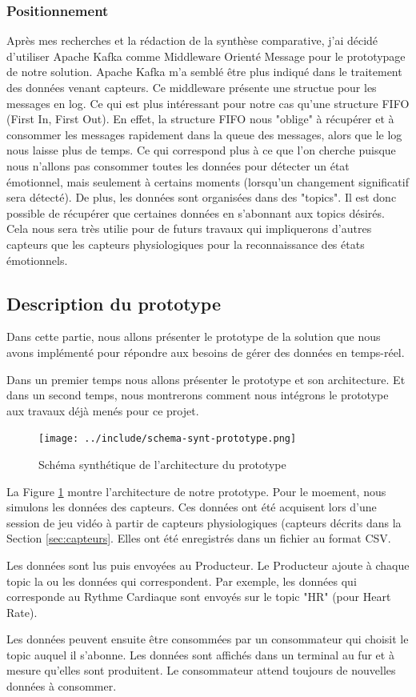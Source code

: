 \documentclass{article}
\begin{document}
		\subsubsection{Positionnement}
			Après mes recherches et la rédaction de la synthèse comparative, j'ai décidé d'utiliser Apache Kafka comme Middleware Orienté Message pour le prototypage de notre solution.
			Apache Kafka m'a semblé être plus indiqué dans le traitement des données venant capteurs.
			Ce middleware présente une structue pour les messages en log.
			Ce qui est plus intéressant pour notre cas qu'une structure FIFO (First In, First Out).
			En effet, la structure FIFO nous "oblige" à récupérer et à consommer les messages rapidement dans la queue des messages, alors que le log nous laisse plus de temps.
			Ce qui correspond plus à ce que l'on cherche puisque nous n'allons pas consommer toutes les données pour détecter un état émotionnel, mais seulement à certains moments (lorsqu'un changement significatif sera détecté).
			De plus, les données sont organisées dans des "topics".
			Il est donc possible de récupérer que certaines données en s'abonnant aux topics désirés.
			Cela nous sera très utilie pour de futurs travaux qui impliquerons d'autres capteurs que les capteurs physiologiques pour la reconnaissance des états émotionnels.
	\subsection{Description du prototype}
		Dans cette partie, nous allons présenter le prototype de la solution que nous avons implémenté pour répondre aux besoins de gérer des données en temps-réel.\par
		Dans un premier temps nous allons présenter le prototype et son architecture.
		Et dans un second temps, nous montrerons comment nous intégrons le prototype aux travaux déjà menés pour ce projet.\par
		\begin{figure}
			\centering
			\texttt{[image: ../include/schema-synt-prototype.png]}
			\caption{Schéma synthétique de l'architecture du prototype}
			\label{fig:archiproto}
		\end{figure}
		La Figure \ref{fig:archiproto} montre l'architecture de notre prototype.
		Pour le moement, nous simulons les données des capteurs.
		Ces données ont été acquisent lors d'une session de jeu vidéo à partir de capteurs physiologiques (capteurs décrits dans la Section \ref{sec:capteurs}.
		Elles ont été enregistrés dans un fichier au format CSV.\par
		Les données sont lus puis envoyées au Producteur.
		Le Producteur ajoute à chaque topic la ou les données qui correspondent.
		Par exemple, les données qui corresponde au Rythme Cardiaque sont envoyés sur le topic "HR" (pour Heart Rate).\par
		Les données peuvent ensuite être consommées par un consommateur qui choisit le topic auquel il s'abonne.
		Les données sont affichés dans un terminal au fur et à mesure qu'elles sont produitent.
		Le consommateur attend toujours de nouvelles données à consommer.
\end{document}
